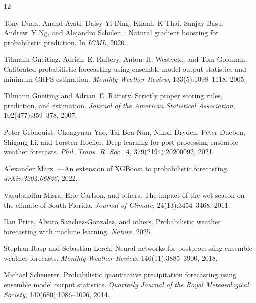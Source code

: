 \documentclass[11pt]{article}
\begin{document}

\begin{thebibliography}{12}

Tony Duan, Anand Avati, Daisy Yi Ding, Khanh~K Thai, Sanjay Basu, Andrew~Y Ng, and Alejandro Schuler.
: Natural gradient boosting for probabilistic prediction.
\newblock In \emph{ICML}, 2020.

Tilmann Gneiting, Adrian~E. Raftery, Anton~H. Westveld, and Tom Goldman.
\newblock Calibrated probabilistic forecasting using ensemble model output statistics and minimum {CRPS} estimation.
\newblock \emph{Monthly Weather Review}, 133(5):1098--1118, 2005.

Tilmann Gneiting and Adrian~E. Raftery.
\newblock Strictly proper scoring rules, prediction, and estimation.
\newblock \emph{Journal of the American Statistical Association}, 102(477):359--378, 2007.

Peter Gr\"onquist, Chengyuan Yao, Tal Ben-Nun, Nikoli Dryden, Peter Dueben, Shigang Li, and Torsten Hoefler.
\newblock Deep learning for post-processing ensemble weather forecasts.
\newblock \emph{Phil. Trans. R. Soc. A}, 379(2194):20200092, 2021.

Alexander M\"arz.
---An extension of {XGBoost} to probabilistic forecasting.
\newblock \emph{arXiv:2204.06826}, 2022.

Vasubandhu Misra, Eric Carlson, and others.
\newblock The impact of the wet season on the climate of {S}outh {F}lorida.
\newblock \emph{Journal of Climate}, 24(13):3454--3468, 2011.

Ilan Price, Alvaro Sanchez-Gonzalez, and others.
\newblock Probabilistic weather forecasting with machine learning.
\newblock \emph{Nature}, 2025.

Stephan Rasp and Sebastian Lerch.
\newblock Neural networks for postprocessing ensemble weather forecasts.
\newblock \emph{Monthly Weather Review}, 146(11):3885--3900, 2018.

Michael Scheuerer.
\newblock Probabilistic quantitative precipitation forecasting using ensemble model output statistics.
\newblock \emph{Quarterly Journal of the Royal Meteorological Society}, 140(680):1086--1096, 2014.


\end{thebibliography}
\end{document}
